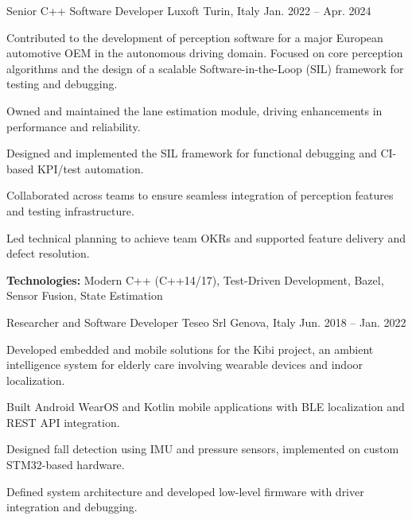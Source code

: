 \begin{cventries}
  \cventry
  {Senior C++ Software Developer} %
  {Luxoft} %
  {Turin, Italy} %
  {Jan. 2022 -- Apr. 2024} %
  {
    \begin{cvparagraph}
      Contributed to the development of perception software for a major European automotive OEM in the autonomous driving domain. Focused on core perception algorithms and the design of a scalable Software-in-the-Loop (SIL) framework for testing and debugging.
    \end{cvparagraph}
    \vspace{1em}
    \begin{cvitems}
    \item {Owned and maintained the lane estimation module, driving enhancements in performance and reliability.}
    \item {Designed and implemented the SIL framework for functional debugging and CI-based KPI/test automation.}
    \item {Collaborated across teams to ensure seamless integration of perception features and testing infrastructure.}
    \item {Led technical planning to achieve team OKRs and supported feature delivery and defect resolution.}
    \item {\textbf{Technologies:} Modern C++ (C++14/17), Test-Driven Development, Bazel, Sensor Fusion, State Estimation}
    \end{cvitems}
  }

  \cventry
  {Researcher and Software Developer} %
  {Teseo Srl} %
  {Genova, Italy} %
  {Jun. 2018 -- Jan. 2022} %
  {
    \begin{cvparagraph}
      Developed embedded and mobile solutions for the Kibi project, an ambient intelligence system for elderly care involving wearable devices and indoor localization.
    \end{cvparagraph}
    \vspace{1em}
    \begin{cvitems}
    \item {Built Android WearOS and Kotlin mobile applications with BLE localization and REST API integration.}
    \item {Designed fall detection using IMU and pressure sensors, implemented on custom STM32-based hardware.}
    \item {Defined system architecture and developed low-level firmware with driver integration and debugging.}
    \end{cvitems}
  }


\end{cventries}
